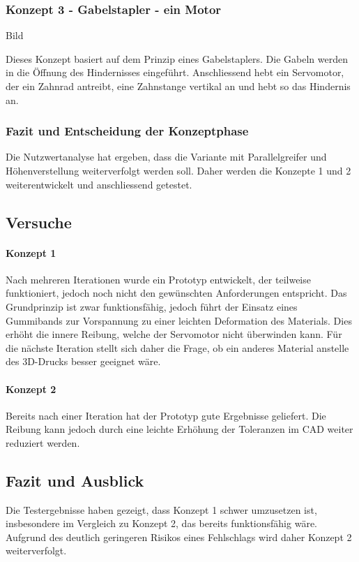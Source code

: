\documentclass[main.tex]{subfiles} %
\begin{document}
\subsubsection*{Konzept 3 - Gabelstapler - ein Motor}

Bild \newline

Dieses Konzept basiert auf dem Prinzip eines Gabelstaplers. Die Gabeln werden in die Öffnung des Hindernisses eingeführt. 
Anschliessend hebt ein Servomotor, der ein Zahnrad antreibt, eine Zahnstange vertikal an und hebt so das Hindernis an.


\newpage

\subsubsection*{Fazit und Entscheidung der Konzeptphase}

Die Nutzwertanalyse hat ergeben, dass die Variante mit Parallelgreifer und Höhenverstellung weiterverfolgt werden soll. 
Daher werden die Konzepte 1 und 2 weiterentwickelt und anschliessend getestet.

\subsection*{Versuche}

\paragraph{Konzept 1}

Nach mehreren Iterationen wurde ein Prototyp entwickelt, der teilweise funktioniert, jedoch noch nicht den gewünschten 
Anforderungen entspricht. Das Grundprinzip ist zwar funktionsfähig, jedoch führt der Einsatz eines Gummibands zur Vorspannung 
zu einer leichten Deformation des Materials. Dies erhöht die innere Reibung, welche der Servomotor nicht überwinden kann. 
Für die nächste Iteration stellt sich daher die Frage, ob ein anderes Material anstelle des 3D-Drucks besser geeignet wäre.

\paragraph{Konzept 2}

Bereits nach einer Iteration hat der Prototyp gute Ergebnisse geliefert. 
Die Reibung kann jedoch durch eine leichte Erhöhung der Toleranzen im CAD weiter reduziert werden.

\subsection*{Fazit und Ausblick}

Die Testergebnisse haben gezeigt, dass Konzept 1 schwer umzusetzen ist, insbesondere im Vergleich zu Konzept 2, 
das bereits funktionsfähig wäre. Aufgrund des deutlich geringeren Risikos eines Fehlschlags wird daher Konzept 2 weiterverfolgt.
\end{document}

